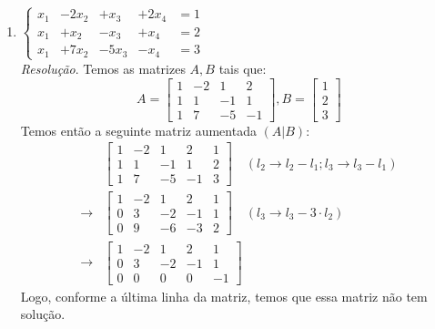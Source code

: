 \begin{enumerate}
    \item $ \left\{\begin{array} {ccccc} 
        x_1 & - 2x_2 & + x_3 & + 2x_4 & = 1 \\
        x_1 & + x_2	 & - x_3 & + x_4 & = 2\\
        x_1 & + 7x_2 & - 5x_3 & - x_4 & = 3
    \end{array} \right. $
    \\ 
    \emph{Resolução}. Temos as matrizes $A, B$ tais que:
    \begin{displaymath}
    A = \left[\begin{array} {cccc} 
        1 & -2 & 1 & 2  \\
        1 & 1 & -1 & 1\\
        1  & 7 & -5 & -1
        \end{array} \right],
    B = \left[\begin{array}{c} 
        1 \\ 
        2 \\ 
        3 
        \end{array} \right]
    \end{displaymath}
    Temos então a seguinte matriz aumentada $(A|B)$:
    \begin{align*}
        &\left[\begin{array} {ccccc} 
        1 & -2 & 1 & 2  & 1\\
        1 & 1 & -1 & 1 & 2\\
        1  & 7 & -5 & -1 & 3
        \end{array} \right] \quad (l_2  \rightarrow l_2 - l_1; l_3 \rightarrow l_3 - l_1) \\ \rightarrow
        &\left[\begin{array} {ccccc} 
        1 & -2 & 1 & 2  & 1\\
        0 & 3 & -2 & -1 & 1\\
        0  & 9 & -6 & -3 & 2
        \end{array} \right] \quad (l_3 \rightarrow l_3 - 3 \cdot l_2) \\ \rightarrow
        &\left[\begin{array} {ccccc} 
        1 & -2 & 1 & 2  & 1\\
        0 & 3 & -2 & -1 & 1\\
        0  & 0 & 0 & 0 & -1
        \end{array} \right] 
    \end{align*}
    Logo, conforme a última linha da matriz, temos que essa matriz não tem solução.
\end{enumerate}